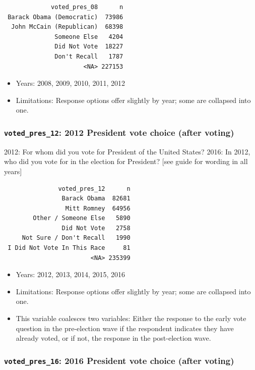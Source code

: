 \documentclass[10pt,article,oneside]{memoir}
\theoremstyle{definition}
\begin{document}
\begin{verbatim}
             voted_pres_08      n
 Barack Obama (Democratic)  73986
  John McCain (Republican)  68398
              Someone Else   4204
              Did Not Vote  18227
              Don't Recall   1787
                      <NA> 227153
\end{verbatim}

\begin{itemize}
\tightlist
\item
  Years: 2008, 2009, 2010, 2011, 2012
\item
  Limitations: Response options offer slightly by year; some are
  collapsed into one.
\end{itemize}

\hypertarget{voted_pres_12-2012-president-vote-choice-after-voting}{%
\subsubsection{\texorpdfstring{\texttt{voted\_pres\_12}: 2012 President
vote choice (after
voting)}{voted\_pres\_12: 2012 President vote choice (after voting)}}\label{voted_pres_12-2012-president-vote-choice-after-voting}}

2012: For whom did you vote for President of the United States? 2016: In
2012, who did you vote for in the election for President? {[}see guide
for wording in all years{]}

\begin{verbatim}
               voted_pres_12      n
                Barack Obama  82681
                 Mitt Romney  64956
        Other / Someone Else   5890
                Did Not Vote   2758
     Not Sure / Don't Recall   1990
 I Did Not Vote In This Race     81
                        <NA> 235399
\end{verbatim}

\begin{itemize}
\tightlist
\item
  Years: 2012, 2013, 2014, 2015, 2016
\item
  Limitations: Response options offer slightly by year; some are
  collapsed into one.
\item
  This variable coalesces two variables: Either the response to the
  early vote question in the pre-election wave if the respondent
  indicates they have already voted, or if not, the response in the
  post-election wave.
\end{itemize}

\hypertarget{voted_pres_16-2016-president-vote-choice-after-voting}{%
\subsubsection{\texorpdfstring{\texttt{voted\_pres\_16}: 2016 President
vote choice (after
voting)}{voted\_pres\_16: 2016 President vote choice (after voting)}}\label{voted_pres_16-2016-president-vote-choice-after-voting}}
\end{document}
